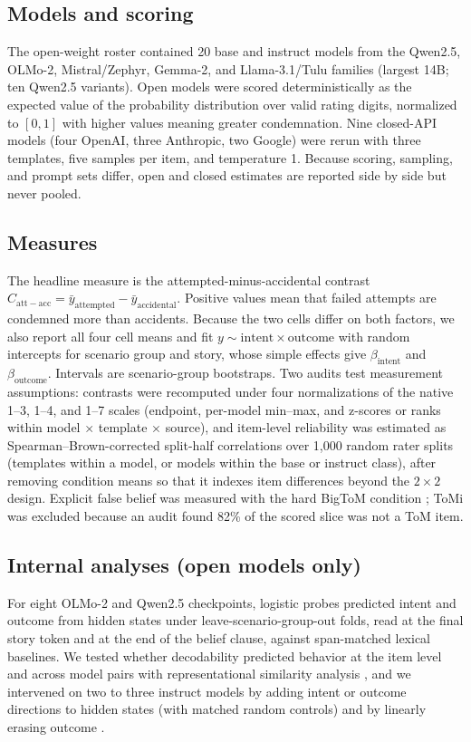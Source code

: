 \documentclass[10pt,letterpaper]{article}
\newcommand{\contrast}{C_{\mathrm{att-acc}}}
\newcommand{\intentbeta}{\beta_{\mathrm{intent}}}
\newcommand{\outcomebeta}{\beta_{\mathrm{outcome}}}
\begin{document}
\subsection{Models and scoring}
The open-weight roster contained 20 base and instruct models from the Qwen2.5, OLMo-2, Mistral/Zephyr, Gemma-2, and Llama-3.1/Tulu families (largest 14B; ten Qwen2.5 variants).
Open models were scored deterministically as the expected value of the probability distribution over valid rating digits, normalized to $[0,1]$ with higher values meaning greater condemnation.
Nine closed-API models (four OpenAI, three Anthropic, two Google) were rerun with three templates, five samples per item, and temperature 1.
Because scoring, sampling, and prompt sets differ, open and closed estimates are reported side by side but never pooled.

\subsection{Measures}
The headline measure is the attempted-minus-accidental contrast $\contrast=\bar y_{\mathrm{attempted}}-\bar y_{\mathrm{accidental}}$.
Positive values mean that failed attempts are condemned more than accidents.
Because the two cells differ on both factors, we also report all four cell means and fit $y\sim\mathrm{intent}\times\mathrm{outcome}$ with random intercepts for scenario group and story, whose simple effects give $\intentbeta$ and $\outcomebeta$.
Intervals are scenario-group bootstraps.
Two audits test measurement assumptions: contrasts were recomputed under four normalizations of the native 1--3, 1--4, and 1--7 scales (endpoint, per-model min--max, and z-scores or ranks within model $\times$ template $\times$ source), and item-level reliability was estimated as Spearman--Brown-corrected split-half correlations over 1{,}000 random rater splits (templates within a model, or models within the base or instruct class), after removing condition means so that it indexes item differences beyond the $2\times2$ design.
Explicit false belief was measured with the hard BigToM condition \citep{gandhi2023bigtom}; ToMi was excluded because an audit found 82\% of the scored slice was not a ToM item.

\subsection{Internal analyses (open models only)}
For eight OLMo-2 and Qwen2.5 checkpoints, logistic probes predicted intent and outcome from hidden states under leave-scenario-group-out folds, read at the final story token and at the end of the belief clause, against span-matched lexical baselines.
We tested whether decodability predicted behavior at the item level and across model pairs with representational similarity analysis \citep{kriegeskorte2008rsa}, and we intervened on two to three instruct models by adding intent or outcome directions to hidden states (with matched random controls) and by linearly erasing outcome \citep{belrose2023leace}.
\end{document}
